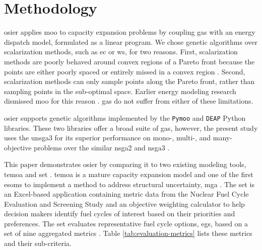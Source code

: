 \section{Methodology}




\gls{osier} applies \gls{moo} to capacity expansion problems by coupling
\glspl{ga} with an energy dispatch model, formulated as a linear program. We
chose genetic algorithms over scalarization methods, such as \gls{ec} or
\gls{ws}, for two reasons. First, scalarization methods are poorly behaved
around convex regions of a Pareto front because the points are either poorly
spaced or entirely missed in a convex region \cite{emmerich_tutorial_2018}.
Second, scalarization methods can only sample points along the Pareto front,
rather than sampling points in the sub-optimal space. Earlier energy modeling
research dismissed \gls{moo} for this reason \cite{decarolis_using_2011}.
\glspl{ga} do not suffer from either of these limitations.

\gls{osier} supports genetic algorithms implemented by the \texttt{Pymoo}
\cite{blank_pymoo_2020} and \texttt{DEAP} \cite{fortin_deap_2012} Python
libraries. These two libraries offer a broad suite of \glspl{ga}, however, the
present study uses the \gls{unsga3} for its superior performance on mono-,
multi-, and many-objective problems over the similar \gls{nsga2} and \gls{nsga3}
\cite{seada_unified_2016}. 

This paper demonstrates \gls{osier} by comparing it to two existing modeling
tools, \gls{temoa} \cite{decarolis_temoa_2010} and \gls{set}
\cite{wigeland_nuclear_2014-2}. \gls{temoa} is a mature capacity expansion model
and one of the first \glspl{esom} to implement a method to address structural
uncertainty, \gls{mga} \cite{decarolis_using_2011,decarolis_modelling_2016}. The
\gls{set} is an Excel-based application containing metric data from the Nuclear
Fuel Cycle Evaluation and Screening Study \cite{wigeland_nuclear_2014-2} and an
objective weighting calculator to help decision makers identify fuel cycles of
interest based on their priorities and preferences. The \gls{set} evaluates
representative fuel cycle options, \glspl{eg}, based on a set of nine aggregated
metrics \cite{wigeland_nuclear_2014}. Table \ref{tab:evaluation-metrics} lists
these metrics and their sub-criteria.

